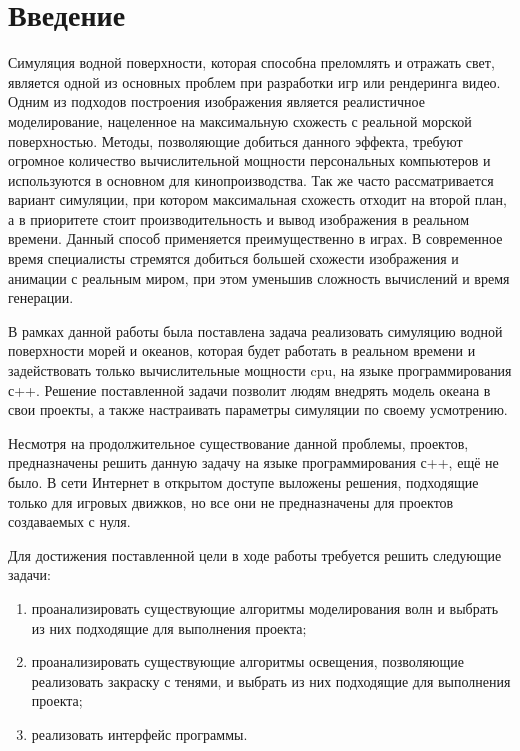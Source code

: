 	\chapter*{Введение}
	
	Симуляция водной поверхности, которая способна преломлять и отражать свет, является одной из основных проблем при разработки игр или рендеринга видео. Одним из подходов построения изображения является реалистичное моделирование, нацеленное на максимальную схожесть с реальной морской поверхностью. Методы, позволяющие добиться данного эффекта, требуют огромное количество вычислительной мощности персональных компьютеров и используются в основном для кинопроизводства. Так же часто рассматривается вариант симуляции, при котором максимальная схожесть отходит на второй план, а в приоритете стоит производительность и вывод изображения в реальном времени. Данный способ применяется преимущественно в играх. В современное время специалисты стремятся добиться большей схожести изображения и анимации с реальным миром, при этом уменьшив сложность вычислений и время генерации.
	
	В рамках данной работы была поставлена задача реализовать симуляцию водной поверхности морей и океанов, которая будет работать в реальном времени и задействовать только вычислительные мощности cpu, на языке программирования с++. Решение поставленной задачи позволит людям внедрять модель океана в свои проекты, а также настраивать параметры симуляции по своему усмотрению.
	
	Несмотря на продолжительное существование данной проблемы, проектов, предназначены решить данную задачу на языке программирования с++, ещё не было. В сети Интернет в открытом доступе выложены решения, подходящие только для игровых движков, но все они не предназначены для проектов создаваемых с нуля.
	
	Для достижения поставленной цели в ходе работы требуется решить следующие задачи: 
	\begin{enumerate}
		\item проанализировать существующие алгоритмы моделирования волн и выбрать из них подходящие для выполнения проекта;
		\item проанализировать существующие алгоритмы освещения, позволяющие реализовать закраску с тенями, и выбрать из них подходящие для выполнения проекта;
		\item реализовать интерфейс программы.
	\end{enumerate}
